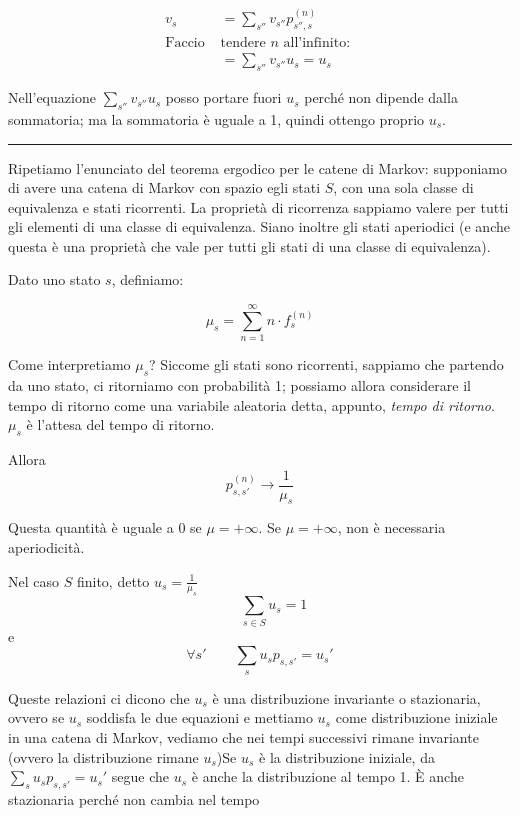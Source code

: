 \documentclass[a4paper,12pt]{book}
\newcommand\ddfrac[2]{\frac{\displaystyle #1}{\displaystyle #2}}
\begin{document}
\begin{align*}
	v_s & = \sum_{s''}v_{s''}p_{s'',s}^{(n)} \\
	 \text{Faccio } & \text{tendere } n \text{ all'infinito: }\\
	& = \sum_{s''}v_{s''}u_s = u_s
\end{align*}

Nell'equazione $ \sum_{s''}v_{s''}u_s $ posso portare fuori $ u_s $ perché non dipende dalla sommatoria; ma la sommatoria è uguale a 1, quindi ottengo proprio $ u_s $.

\vspace{1cm}
\hrule 
\vspace{1cm}

Ripetiamo l'enunciato del teorema ergodico per le catene di Markov: supponiamo di avere una catena di Markov con spazio egli stati $ S $, con una sola classe di equivalenza e stati ricorrenti. La proprietà di ricorrenza sappiamo valere per tutti gli elementi di una classe di equivalenza. Siano inoltre gli stati aperiodici (e anche questa è una proprietà che vale per tutti gli stati di una classe di equivalenza).

Dato uno stato $ s $, definiamo:

$$ \mu_s = \sum_{n=1}^{\infty} n \cdot f_s^{(n)} $$

Come interpretiamo $ \mu_s $? Siccome gli stati sono ricorrenti, sappiamo che partendo da uno stato, ci ritorniamo con probabilità 1; possiamo allora considerare il tempo di ritorno come una variabile aleatoria detta, appunto, \textit{tempo di ritorno}. $ \mu_s $ è l'attesa del tempo di ritorno. 

Allora 
$$ p_{s,s'}^{(n)} \to \ddfrac{1}{\mu_s} $$

Questa quantità è uguale a 0 se $ \mu = +\infty $. Se $ \mu= +\infty $, non è necessaria aperiodicità. 

Nel caso $ S $ finito, detto $ u_s = \ddfrac{1}{\mu_s} $
$$ \qquad \displaystyle \sum_{s \in S} u_s = 1 $$
e
$$ \forall s' \qquad \sum_{s} u_s p_{s,s'} = u_s'$$

Queste relazioni ci dicono che $ u_s $ è una distribuzione invariante o stazionaria, ovvero se $ u_s $ soddisfa le due equazioni e mettiamo $ u_s $ come distribuzione iniziale in una catena di Markov, vediamo che nei tempi successivi rimane invariante (ovvero la distribuzione rimane $ u_s $)Se $ u_s $ è la distribuzione iniziale, da $ \sum_{s} u_s p_{s,s'} = u_s' $ segue che $ u_s $ è anche la distribuzione al tempo 1. È anche stazionaria perché non cambia nel tempo
\end{document}

